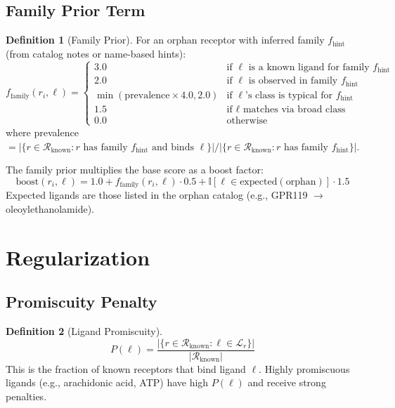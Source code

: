 \documentclass[12pt,oneside]{article}
\theoremstyle{definition}
\newtheorem{definition}{Definition}[section]
\newcommand{\RR}{\mathcal{R}}
\begin{document}
\subsection{Family Prior Term}

\begin{definition}[Family Prior]
For an orphan receptor with inferred family $f_{\text{hint}}$ (from catalog notes or name-based hints):
\begin{equation}
f_{\text{family}}(r_i, \ell) = 
\begin{cases}
3.0 & \text{if } \ell \text{ is a known ligand for family } f_{\text{hint}} \\
2.0 & \text{if } \ell \text{ is observed in family } f_{\text{hint}} \\
\min(\text{prevalence} \times 4.0, 2.0) & \text{if } \ell\text{'s class is typical for } f_{\text{hint}} \\
1.5 & \text{if } \ell \text{ matches via broad class} \\
0.0 & \text{otherwise}
\end{cases}
\label{eq:family_prior}
\end{equation}
where prevalence $= |\{r \in \RR_{\text{known}} : r \text{ has family } f_{\text{hint}} \text{ and binds } \ell\}| / |\{r \in \RR_{\text{known}} : r \text{ has family } f_{\text{hint}}\}|$.

The family prior multiplies the base score as a boost factor:
\begin{equation}
\text{boost}(r_i, \ell) = 1.0 + f_{\text{family}}(r_i, \ell) \cdot 0.5 + \mathbb{I}[\ell \in \text{expected}(\text{orphan})] \cdot 1.5
\label{eq:family_boost}
\end{equation}
Expected ligands are those listed in the orphan catalog (e.g., GPR119 $\to$ oleoylethanolamide).
\end{definition}

\section{Regularization}

\subsection{Promiscuity Penalty}

\begin{definition}[Ligand Promiscuity]
\begin{equation}
P(\ell) = \frac{|\{r \in \RR_{\text{known}} : \ell \in \mathcal{L}_r\}|}{|\RR_{\text{known}}|}
\label{eq:promiscuity}
\end{equation}
This is the fraction of known receptors that bind ligand $\ell$. Highly promiscuous ligands (e.g., arachidonic acid, ATP) have high $P(\ell)$ and receive strong penalties.
\end{definition}
\end{document}
